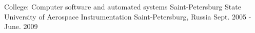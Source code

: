 
\begin{cventries}
  \cventry
    {College: Computer software and automated systems}
    {Saint-Petersburg State University of Aerospace Instrumentation}
    {Saint-Petersburg, Russia}
    {Sept. 2005 - June. 2009}
    {}
\end{cventries}